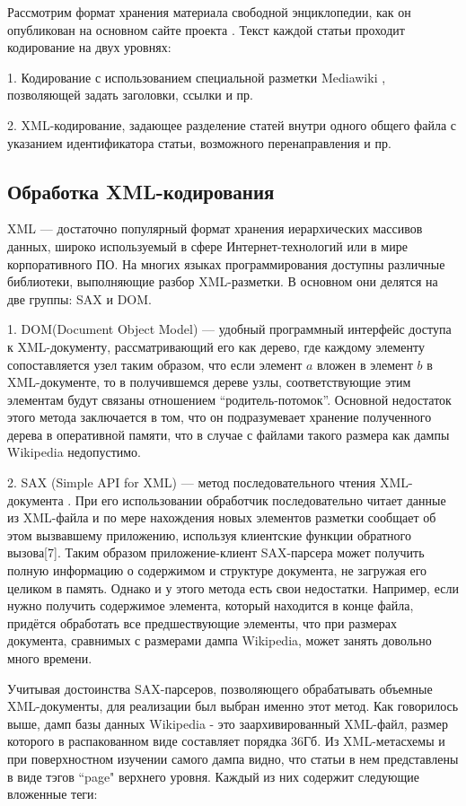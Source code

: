 Рассмотрим формат хранения материала свободной энциклопедии, как он
опубликован на основном сайте проекта \cite{download}. Текст каждой статьи проходит
кодирование на двух уровнях:

1. Кодирование с использованием специальной разметки Mediawiki \cite{wikimarkup},
позволяющей задать заголовки, ссылки и пр.

2. XML-кодирование, задающее разделение статей внутри одного общего
файла с указанием идентификатора статьи, возможного перенаправления и
пр.

\subsection{Обработка XML-кодирования}

XML --- достаточно популярный формат хранения иерархических массивов
данных, широко используемый в сфере Интернет-технологий или в мире
корпоративного ПО. На многих языках программирования доступны
различные библиотеки, выполняющие разбор XML-разметки. В основном они
делятся на две группы: SAX и DOM.

1. DOM(Document Object Model) \cite{dom} --- удобный программный интерфейс доступа 
к XML-документу, рассматривающий его как дерево, где каждому элементу 
сопоставляется узел таким образом, что если элемент $a$ вложен в элемент $b$ 
в XML-документе, то в получившемся дереве узлы, соответствующие этим элементам 
будут связаны отношением “родитель-потомок”.
Основной недостаток этого метода заключается в том, что он подразумевает хранение 
полученного дерева в оперативной памяти, что в случае с файлами такого размера 
как дампы Wikipedia недопустимо.

2. SAX (Simple API for XML) --- метод последовательного чтения XML-документа \cite{sax}. 
При его использовании обработчик последовательно читает данные
из XML-файла и по мере нахождения новых элементов разметки сообщает об этом вызвавшему приложению, 
используя клиентские функции обратного вызова[7]. Таким образом приложение-клиент 
SAX-парсера может получить полную информацию о содержимом и структуре документа,
не загружая его целиком в память. Однако и у этого метода есть свои недостатки. 
Например, если нужно получить содержимое элемента, который находится в конце файла,
придётся обработать все предшествующие элементы, что при размерах документа, сравнимых
с размерами дампа Wikipedia, может занять довольно много времени.

Учитывая достоинства SAX-парсеров, позволяющего обрабатывать объемные XML-документы, 
для реализации был выбран именно этот метод.
Как говорилось выше, дамп базы данных Wikipedia \cite{dump} - это заархивированный XML-файл, размер которого 
в распакованном виде составляет порядка 36Гб. Из XML-метасхемы \cite{schema} 
и при поверхностном изучении самого дампа видно, что статьи в нем представлены в виде 
тэгов ``page" верхнего уровня. Каждый из них содержит следующие вложенные теги:

